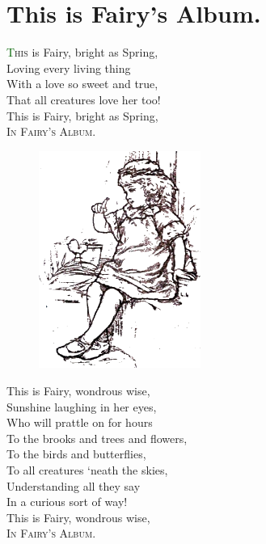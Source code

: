 \documentclass[oneside,12pt,english]{book}
\newcommand*\initfamily{\usefont{U}{Acorn}{xl}{n}}
\begin{document}
\begin{titlepage}
  
  \thispagestyle{empty}
\end{titlepage}


\newpage
\setcounter{page}{3}

\section*{This is Fairy's Album.}

\Large
\lettrine[lines=3]{\initfamily\textcolor{darkgreen}{T}}{his} is Fairy, bright as
Spring,\\
Loving every living thing\\
With a love so sweet and true,\\
That all creatures love her too!\\
This is Fairy, bright as Spring,\\
\textsc{In Fairy's Album}.

\begin{figure}
\centering
\includegraphics[height=2.8in]{fig01.png}
\end{figure}

This is Fairy, wondrous wise,\\
Sunshine laughing in her eyes,\\
Who will prattle on for hours\\
To the brooks and trees and flowers,\\
To the birds and butterflies,\\
To all creatures `neath the skies,\\
Understanding all they say\\
In a curious sort of way!\\
This is Fairy, wondrous wise,\\
\textsc{In Fairy's Album}.
\end{document}
